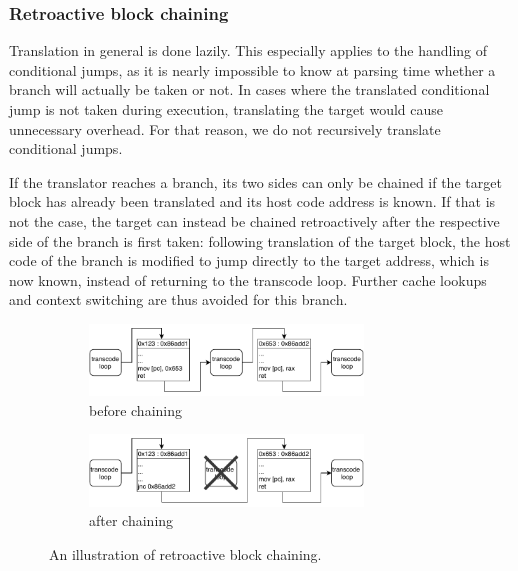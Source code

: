\subsubsection{Retroactive block chaining}
\label{sec:chaining}
Translation in general is done lazily.
This especially applies to the handling of conditional jumps, as it is nearly impossible to know at parsing time whether a branch will actually be taken or not.
In cases where the translated conditional jump is not taken during execution, translating the target would cause unnecessary overhead.
For that reason, we do not recursively translate conditional jumps.

If the translator reaches a branch, its two sides can only be chained if the target block has already been translated and its host code address is known.
If that is not the case, the target can instead be chained retroactively after the respective side of the branch is first taken:
following translation of the target block, the host code of the branch is modified to jump directly to the target address, which is now known, instead of returning to the transcode loop.
Further cache lookups and context switching are thus avoided for this branch.

\begin{figure}[h]
	\begin{center}
		\begin{subfigure}[b]{\textwidth}
			\centering
			\includegraphics[width=0.8\textwidth]{media/chaining-unchained.pdf}
			\caption{before chaining}
		\end{subfigure}
		\begin{subfigure}[b]{\textwidth}
			\centering
			\includegraphics[width=0.8\textwidth]{media/chaining-chained.pdf}
			\caption{after chaining}
		\end{subfigure}
	\end{center}
	
	\caption[Block chaining illustration]%
	{An illustration of retroactive block chaining.}
\end{figure}


